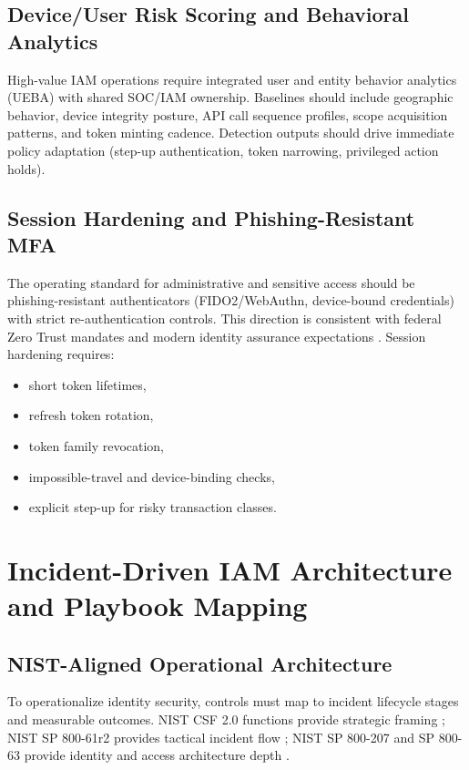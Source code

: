 \documentclass[11pt]{article}
\begin{document}
\subsection{Device/User Risk Scoring and Behavioral Analytics}
High-value IAM operations require integrated user and entity behavior analytics (UEBA) with shared SOC/IAM ownership. Baselines should include geographic behavior, device integrity posture, API call sequence profiles, scope acquisition patterns, and token minting cadence. Detection outputs should drive immediate policy adaptation (step-up authentication, token narrowing, privileged action holds).

\subsection{Session Hardening and Phishing-Resistant MFA}
The operating standard for administrative and sensitive access should be phishing-resistant authenticators (FIDO2/WebAuthn, device-bound credentials) with strict re-authentication controls. This direction is consistent with federal Zero Trust mandates and modern identity assurance expectations \cite{executive_order_mfa,nist_800_63}. Session hardening requires:
\begin{itemize}[leftmargin=1.5em]
    \item short token lifetimes,
    \item refresh token rotation,
    \item token family revocation,
    \item impossible-travel and device-binding checks,
    \item explicit step-up for risky transaction classes.
\end{itemize}

\section{Incident-Driven IAM Architecture and Playbook Mapping}
\subsection{NIST-Aligned Operational Architecture}
To operationalize identity security, controls must map to incident lifecycle stages and measurable outcomes. NIST CSF 2.0 functions provide strategic framing \cite{nist_csf_2}; NIST SP 800-61r2 provides tactical incident flow \cite{nist_800_61}; NIST SP 800-207 and SP 800-63 provide identity and access architecture depth \cite{nist_800_207,nist_800_63}.
\end{document}

